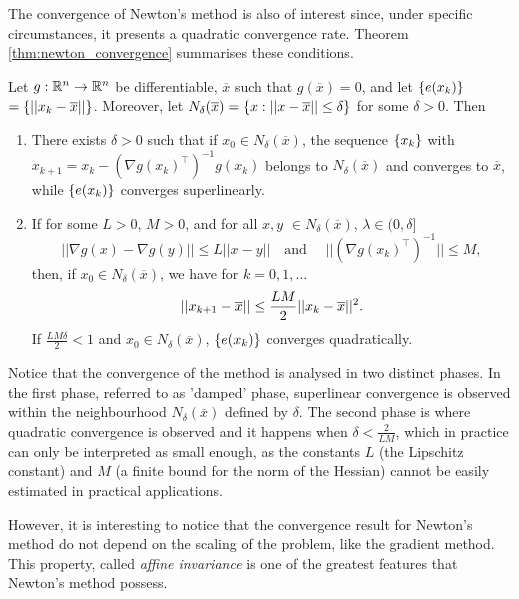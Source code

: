 The convergence of Newton's method is also of interest since, under specific circumstances, it presents a  quadratic convergence rate. Theorem \ref{thm:newton_convergence} summarises these conditions.

\begin{theorem} \label{thm:newton_convergence}
Let $g: \mathbb{R}^n \rightarrow \mathbb{R}^n$ be differentiable, $\overline{x}$ such that $g(\overline{x}) = 0$, and let $\left\{ e(x_k) \right \} $ $= \left\{ ||x_k - \overline{x}|| \right \}$. Moreover, let $N_\delta(\overline{x}) = \left\{ x : ||x  - \overline{x}|| \leq \delta \right \}$ for some $\delta >0 $. Then
\begin{enumerate}
\item There exists $\delta > 0$ such that if $x_0 \in N_\delta(\overline{x})$, the sequence $\left\{ x_k \right \}$ with $x_{k+1} = x_k - (\nabla g(x_k)^\top)^{-1}g(x_k)$ belongs to $N_\delta(\overline{x})$ and converges to $\overline{x}$, while $\left\{ e(x_k) \right \}$ converges superlinearly.
\item If for some $L>0$, $M>0$, and for all $x,y$ $\in N_\delta(\overline{x})$, $\lambda \in (0,\delta]$
$$||\nabla g(x) - \nabla g(y)|| \leq L||x-y|| \quad\text{and }\quad ||(\nabla g(x_k)^\top)^{-1}|| \leq M,$$ 
then, if $x_0 \in N_\delta(\overline{x})$, we have for $k = 0,1,\dots$
\vspace{-6pt}
$$ ||x_{k+1} - \overline{x}|| \leq \frac{LM}{2}||x_k - \overline{x}||^2.
\vspace{-6pt}
$$
If $\frac{LM\delta}{2} < 1$ and $x_0 \in N_\delta(\overline{x})$, $\left\{ e(x_k) \right \}$ converges quadratically.
\end{enumerate}
\end{theorem}

Notice that the convergence of the method is analysed in two distinct phases. In the first phase, referred to as 'damped' phase, superlinear convergence is observed within the neighbourhood $N_\delta(\overline{x})$ defined by $\delta$. The second phase is where quadratic convergence is observed and it happens when $\delta < \frac{2}{LM}$, which in practice can only be interpreted as small enough, as the constants $L$ (the Lipschitz constant) and $M$ (a finite bound for the norm of the Hessian) cannot be easily estimated in practical applications. 

However, it is interesting to notice that the convergence result for Newton's method do not depend  on the scaling of the problem, like the gradient method. This property, called \emph{affine invariance} is one of the greatest features that Newton's method possess. 

